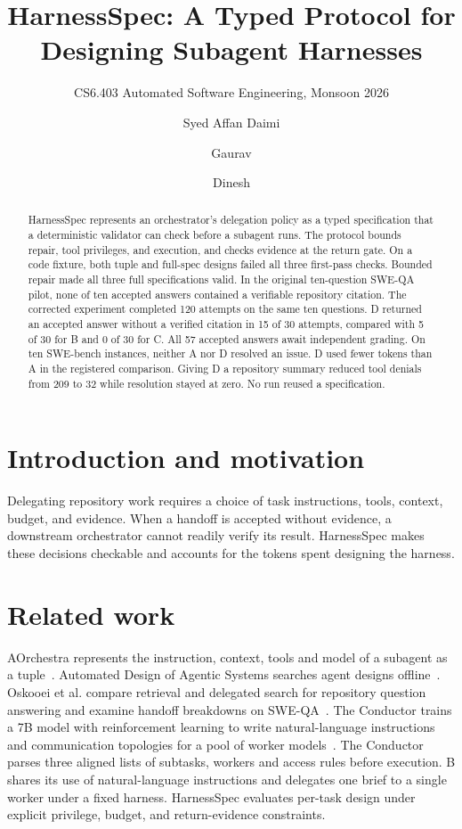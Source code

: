 \documentclass[sigconf,nonacm]{acmart}
\title{HarnessSpec: A Typed Protocol for Designing Subagent Harnesses}
\subtitle{CS6.403 Automated Software Engineering, Monsoon 2026}
\author{Syed Affan Daimi}
\author{Gaurav}
\author{Dinesh}
\begin{document}
\begin{abstract}
HarnessSpec represents an orchestrator's delegation policy as a typed
specification that a deterministic validator can check before a subagent runs.
The protocol bounds repair, tool privileges, and execution, and checks evidence
at the return gate. On a code fixture, both tuple and full-spec designs
failed all three first-pass checks. Bounded repair made all three full
specifications valid. In the original ten-question SWE-QA pilot, none of
ten accepted answers contained a verifiable repository citation.
The corrected experiment completed 120 attempts on the same ten questions.
D returned an accepted answer without a verified citation in 15 of 30
attempts, compared with 5 of 30 for B and 0 of 30 for C.
All 57 accepted answers await independent grading. On ten SWE-bench
instances, neither A nor D resolved an issue. D used fewer tokens than A in
the registered comparison. Giving D a repository summary reduced tool denials
from 209 to 32 while resolution stayed at zero. No run reused a specification.
\end{abstract}
\maketitle

\section{Introduction and motivation}
Delegating repository work requires a choice of task instructions, tools, context,
budget, and evidence. When a handoff is accepted without evidence, a downstream
orchestrator cannot readily verify its result. HarnessSpec makes these decisions
checkable and accounts for the tokens spent designing the harness.

\section{Related work}
AOrchestra represents the instruction, context, tools and model of a subagent as
a tuple~\cite{aorchestra}. Automated Design of Agentic Systems searches agent
designs offline~\cite{adas}. Oskooei et al. compare retrieval and delegated
search for repository question answering and examine handoff breakdowns on
SWE-QA~\cite{oskooei}. The Conductor trains a 7B model with reinforcement
learning to write natural-language instructions and communication topologies
for a pool of worker models~\cite{conductor}. The Conductor parses
three aligned lists of subtasks, workers and access rules before execution.
B shares its use of natural-language instructions and delegates one brief
to a single worker under a fixed harness.
HarnessSpec evaluates per-task design under explicit
privilege, budget, and return-evidence constraints.
\end{document}
